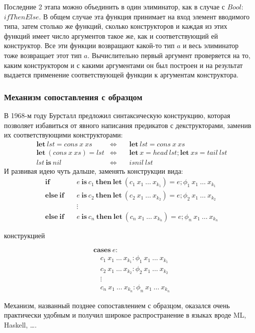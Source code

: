 Последние 2 этапа можно объединить в один элиминатор, как в случае с \(Bool\):
\(ifThenElse\). В общем случае эта функция принимает на вход элемент вводимого
типа, затем столько же функций, сколько конструкторов и каждая из этих функций
имеет число аргументов такое же, как и соответствующий ей конструктор. Все эти
функции возвращают какой-то тип \(a\) и весь элиминатор тоже возвращает этот тип \(a\).
Вычислительно первый аргумент проверяется на то, каким конструктором и с какими
аргументами он был построен и на результат выдается применение соответствующей
функции к аргументам конструктора.

\subsubsection{Механизм сопоставления с образцом}

В 1968-м году Бурсталл \cite{proving-properties-of-programs-by-structural-induction}
предложил синтаксическую конструкцию, которая позволяет избавиться от явного написания
предикатов с декструкторами, заменив их соответствующими конструкторами:
\begin{align*}
&\mathbf{let}\ lst = cons\ x\ xs &\Leftrightarrow &\quad\mathbf{let}\ lst = cons\ x\ xs\\
&\mathbf{let}\ (cons\ x\ xs) = lst &\Leftrightarrow
   &\quad\mathbf{let}\ x = head\ lst; \mathbf{let}\ xs = tail\ lst\\
&lst\ \mathbf{is}\ nil &\Leftrightarrow &\quad isnil\ lst
\end{align*}
И развивая идею чуть дальше, заменять конструкции вида:
\begin{align*}
&\mathbf{if}\ &&e\ \mathbf{is}\ c_1\ \mathbf{then\ let}\ (c_1\ x_1\ \dots\ x_{k_1}) = e;
   \phi_1\ x_1\ \dots\ x_{k_1}\\
&\mathbf{else\ if}\ &&e\ \mathbf{is}\ c_2\ \mathbf{then\ let}\ (c_2\ x_1\ \dots\ x_{k_2}) = e;
   \phi_2\ x_1\ \dots\ x_{k_2}\\
&&&\vdots\\
&\mathbf{else\ if}\ &&e\ \mathbf{is}\ c_n\ \mathbf{then\ let}\ (c_n\ x_1\ \dots\ x_{k_n}) = e;
   \phi_n\ x_1\ \dots\ x_{k_n}
\end{align*}

конструкцией

\begin{align*}
&\mathbf{cases}\ e:\\
&\quad c_1\ x_1\ \dots\ x_{k_1}: \phi_1\ x_1\ \dots\ x_{k_1}\\
&\quad c_2\ x_1\ \dots\ x_{k_2}: \phi_2\ x_1\ \dots\ x_{k_2}\\
&\quad\vdots\\
&\quad c_n\ x_1\ \dots\ x_{k_n}: \phi_n\ x_1\ \dots\ x_{k_n}
\end{align*}

Механизм, названный позднее сопоставлением с образцом, оказался очень
практически удобным и получил широкое распространение в языках
вроде ML, Haskell, \dots.
